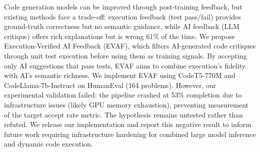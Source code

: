 Code generation models can be improved through post-training feedback, but existing methods face a trade-off: execution feedback (test pass/fail) provides ground-truth correctness but no semantic guidance, while AI feedback (LLM critique) offers rich explanations but is wrong 61\% of the time. We propose Execution-Verified AI Feedback (EVAF), which filters AI-generated code critiques through unit test execution before using them as training signals. By accepting only AI suggestions that pass tests, EVAF aims to combine execution's fidelity with AI's semantic richness. We implement EVAF using CodeT5-770M and CodeLlama-7b-Instruct on HumanEval (164 problems). However, our experimental validation failed: the pipeline crashed at 53\% completion due to infrastructure issues (likely GPU memory exhaustion), preventing measurement of the target accept rate metric. The hypothesis remains untested rather than refuted. We release our implementation and report this negative result to inform future work requiring infrastructure hardening for combined large model inference and dynamic code execution.
